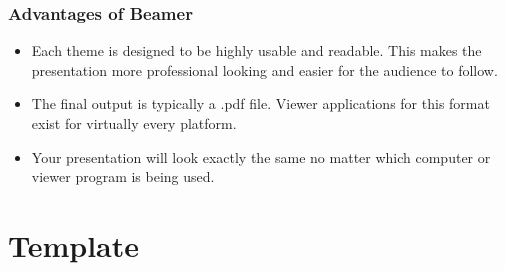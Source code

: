 \documentclass[aspectratio=169,utf8]{ctexbeamer}
\begin{document}
\begin{frame}
  \frametitle{Advantages of Beamer}

  \begin{itemize}
    \setlength{\itemsep}{8pt}
    \item Each theme is designed to be highly usable and readable. This makes the presentation more professional looking and easier for the audience to follow.
    \item The final output is typically a \alert{.pdf} file. Viewer applications for this format exist for virtually every platform.
    \item \alert{Your presentation will look exactly the same no matter which computer or viewer program is being used.}
  \end{itemize}
  
\end{frame}

\section{Template}
\end{document}
